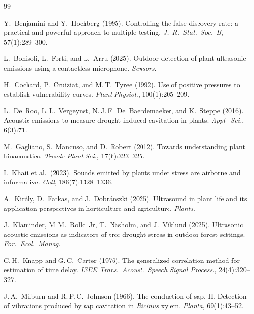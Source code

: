 \documentclass[10pt,a4paper,twocolumn]{article}
\begin{document}
\FloatBarrier  %

{\footnotesize
\setlength{\bibsep}{1pt plus 0.3ex}
\begin{thebibliography}{99}

Y.~Benjamini and Y.~Hochberg (1995).
Controlling the false discovery rate: a practical and powerful approach to multiple testing.
\textit{J.\ R.\ Stat.\ Soc.\ B}, 57(1):289--300.

L.~Bonisoli, L.~Forti, and L.~Arru (2025).
Outdoor detection of plant ultrasonic emissions using a contactless microphone.
\textit{Sensors}.

H.~Cochard, P.~Cruiziat, and M.\,T.~Tyree (1992).
Use of positive pressures to establish vulnerability curves.
\textit{Plant Physiol.}, 100(1):205--209.

L.~De~Roo, L.\,L.~Vergeynst, N.\,J.\,F.~De~Baerdemaeker, and K.~Steppe (2016).
Acoustic emissions to measure drought-induced cavitation in plants.
\textit{Appl.\ Sci.}, 6(3):71.

M.~Gagliano, S.~Mancuso, and D.~Robert (2012).
Towards understanding plant bioacoustics.
\textit{Trends Plant Sci.}, 17(6):323--325.

I.~Khait et al.\ (2023).
Sounds emitted by plants under stress are airborne and informative.
\textit{Cell}, 186(7):1328--1336.

A.~Kir\'{a}ly, D.~Farkas, and J.~Dobr\'{a}nszki (2025).
Ultrasound in plant life and its application perspectives in horticulture and agriculture.
\textit{Plants}.

J.~Klaminder, M.\,M.~Rollo~Jr, T.~N\"asholm, and J.~Viklund (2025).
Ultrasonic acoustic emissions as indicators of tree drought stress in outdoor forest settings.
\textit{For.\ Ecol.\ Manag.}

C.\,H.~Knapp and G.\,C.~Carter (1976).
The generalized correlation method for estimation of time delay.
\textit{IEEE Trans.\ Acoust.\ Speech Signal Process.}, 24(4):320--327.

J.\,A.~Milburn and R.\,P.\,C.~Johnson (1966).
The conduction of sap. II. Detection of vibrations produced by sap cavitation in \textit{Ricinus} xylem.
\textit{Planta}, 69(1):43--52.


\end{thebibliography}}
\end{document}
